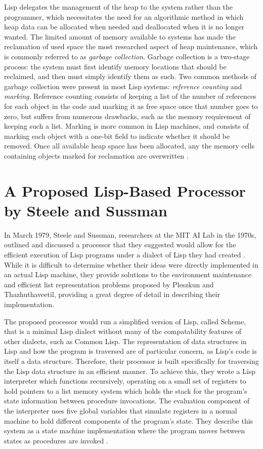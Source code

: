 \documentclass[journal]{IEEEtran}
\begin{document}
Lisp delegates the management of the heap to the system rather than the programmer, which necessitates the need for an algorithmic method in which heap data can be allocated when needed and deallocated when it is no longer wanted. The limited amount of memory available to systems has made the reclamation of used space the most researched aspect of heap maintenance, which is commonly referred to as \textit{garbage collection}. Garbage collection is a two-stage process: the system must first identify memory locations that should be reclaimed, and then must simply identify them as such. Two common methods of garbage collection were present in most Lisp systems: \textit{reference counting} and \textit{marking}. Reference counting consists of keeping a list of the number of references for each object in the code and marking it as free space once that number goes to zero, but suffers from numerous drawbacks, such as the memory requirement of keeping such a list. Marking is more common in Lisp machines, and consists of marking each object with a one-bit field to indicate whether it should be removed. Once all available heap space has been allocated, any the memory cells containing objects marked for reclamation are overwritten \cite{pt}.

\section{A Proposed Lisp-Based Processor by Steele and Sussman}
In March 1979, Steele and Sussman, researchers at the MIT AI Lab in the 1970s, outlined and discussed a processor that they suggested would allow for the efficient execution of Lisp programs under a dialect of Lisp they had created \cite{ss}. While it is difficult to determine whether their ideas were directly implemented in an actual Lisp machine, they provide solutions to the environment maintenance and efficient list representation problems proposed by Pleszkun and Thazhuthaveetil, providing a great degree of detail in describing their implementation.

The proposed processor would run a simplified version of Lisp, called Scheme, that is a minimal Lisp dialect without many of the compatability features of other dialects, such as Common Lisp. The representation of data structures in Lisp and how the program is traversed are of particular concern, as Lisp's code is itself a data structure. Therefore, their processor is built specifically for traversing the Lisp data structure in an efficient manner. To achieve this, they wrote a Lisp interpreter which functions recursively, operating on a small set of registers to hold pointers to a list memory system which holds the stack for the program's state information between procedure invocations. The evaluation component of the interpreter uses five global variables that simulate registers in a normal machine to hold different components of the program's state. They describe this system as a state machine implementation where the program moves between states as procedures are invoked \cite{ss}.
\end{document}

